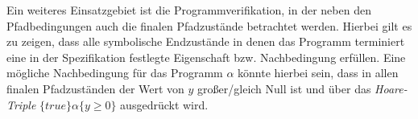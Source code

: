 Ein weiteres Einsatzgebiet ist die Programmverifikation, in der neben den Pfadbedingungen auch die finalen Pfadzustände betrachtet werden. Hierbei gilt es zu zeigen, dass alle symbolische Endzustände in denen das Programm terminiert eine in der Spezifikation festlegte Eigenschaft bzw. Nachbedingung erfüllen. Eine mögliche Nachbedingung für das Programm $\alpha$ könnte hierbei sein, dass in allen finalen Pfadzuständen der Wert von $y$ großer/gleich Null ist und über das \emph{Hoare-Triple} $\{true\}\alpha\{y \geq 0\}$ ausgedrückt wird.